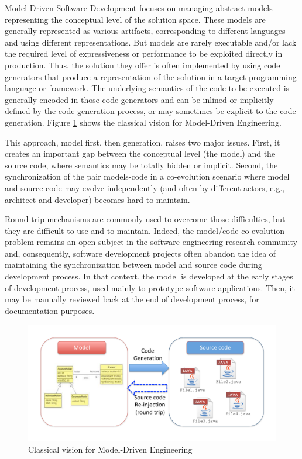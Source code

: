

Model-Driven Software Development focuses on managing abstract models representing the conceptual level of the solution space. These models are generally represented as various artifacts, corresponding to different languages and using different representations. But models are rarely executable and/or lack the required level of expressiveness or performance to be exploited directly in production. Thus, the solution they offer is often implemented by using code generators that produce a representation of the solution in a target programming language or framework\cite{stahl2006model}. The underlying semantics of the code to be executed is generally encoded in those code generators and can be inlined or implicitly defined by the code generation process, or may sometimes be explicit to the code generation. Figure \ref{fig:ClassicalVision} shows the classical vision for Model-Driven Engineering.

This approach, model first, then generation, raises two major issues. First, it creates an important gap between the conceptual level (the model) and the source code, where semantics may be totally hidden or implicit. Second, the synchronization of the pair models-code in a co-evolution scenario where model and source code may evolve independently (and often by different actors, e.g., architect and developer) becomes hard to maintain.

Round-trip mechanisms are commonly used to overcome those difficulties, but they are difficult to use and to maintain. Indeed, the model/code co-evolution problem remains an open subject in the software engineering research community and, consequently, software development projects often abandon the idea of maintaining the synchronization between model and source code during development process. In that context, the model is developed at the early stages of development process, used mainly to prototype software applications. Then, it may be manually reviewed back at the end of development process, for documentation purposes.

\begin{figure}
    \centering
    \includegraphics[width=1.0\columnwidth]{ClassicalVision.pdf}
    \caption{Classical vision for Model-Driven Engineering}
    \label{fig:ClassicalVision}
\end{figure}

